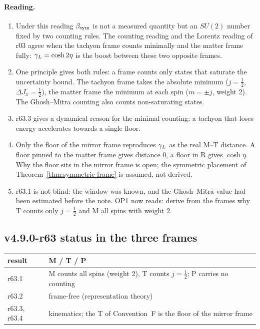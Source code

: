 \paragraph{Reading.}
\begin{enumerate}[leftmargin=2em]
\item Under this reading \(\beta_{\mathrm{sym}}\) is not a measured quantity but an \(SU(2)\) number fixed by two counting rules.  The counting reading and the Lorentz reading of r03 agree
when the tachyon frame counts minimally and the matter frame fully: \(\gamma_L=\cosh2\eta\) is the boost between these two opposite frames.
\item One principle gives both rules: a frame counts only states that saturate the uncertainty bound.  The tachyon frame takes the absolute minimum (\(j=\tfrac12\),
\(\Delta J_x=\tfrac12\)), the matter frame the minimum at each spin (\(m=\pm j\), weight \(2\)).  The Ghosh--Mitra counting also counts non-saturating states.
\item r63.3 gives a dynamical reason for the minimal counting: a tachyon that loses energy accelerates towards a single floor.
\item Only the floor of the mirror frame reproduces \(\gamma_L\) as the real M--T distance.  A floor pinned to the matter frame gives distance \(0\), a floor in R gives
\(\cosh\eta\).  Why the floor sits in the mirror frame is open; the symmetric placement of Theorem~\ref{thm:symmetric-frame} is assumed, not derived.
\item r63.1 is not blind: the window was known, and the Ghosh--Mitra value had been estimated before the note.  OP1 now reads: derive from the frames why T counts only
\(j=\tfrac12\) and M all spins with weight \(2\).
\end{enumerate}

\subsection*{v4.9.0-r63 status in the three frames}
\label{subsec:v490-r63-frames}

\begin{center}
\small
\begin{tabular}{@{}>{\raggedright\arraybackslash}p{}>{\raggedright\arraybackslash}p{}@{}}
\toprule
result & M / T / P\\
\midrule
r63.1 & M counts all spins (weight \(2\)), T counts \(j=\tfrac12\); P carries no counting\\
r63.2 & frame-free (representation theory)\\
r63.3, r63.4 & kinematics; the T of Convention~F is the floor of the mirror frame\\
\bottomrule
\end{tabular}
\end{center}

